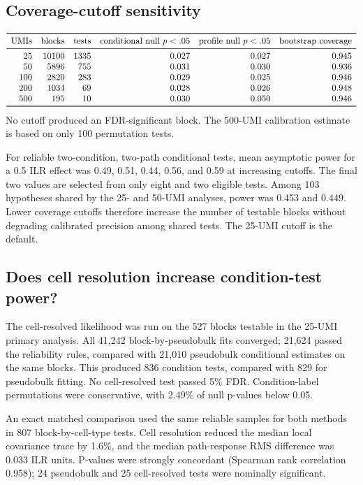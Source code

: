 \documentclass[11pt]{article}
\begin{document}
\subsection*{Coverage-cutoff sensitivity} \[
\begin{array}{rrrrrr}
\toprule
\text{UMIs} & \text{blocks} & \text{tests} &
\text{conditional null }p<.05 & \text{profile null }p<.05 &
\text{bootstrap coverage}\\
\midrule
25  & 10100 & 1335 & 0.027 & 0.027 & 0.945\\
50  &  5896 &  755 & 0.031 & 0.030 & 0.936\\
100 &  2820 &  283 & 0.029 & 0.025 & 0.946\\
200 &  1034 &   69 & 0.028 & 0.026 & 0.948\\
500 &   195 &   10 & 0.030 & 0.050 & 0.946\\
\bottomrule
\end{array}
\]
No cutoff produced an FDR-significant block. The 500-UMI calibration estimate is based on only 100 permutation tests.

For reliable two-condition, two-path conditional tests, mean asymptotic power for a 0.5 ILR effect was 0.49, 0.51, 0.44, 0.56, and 0.59 at increasing cutoffs. The final two values are selected from only eight and two eligible tests. Among 103 hypotheses shared by the 25- and 50-UMI analyses, power was 0.453 and 0.449. Lower coverage cutoffs therefore increase the number of testable blocks without degrading calibrated precision among shared tests. The 25-UMI cutoff is the default.

\subsection*{Does cell resolution increase condition-test power?}

The cell-resolved likelihood was run on the 527 blocks testable in the 25-UMI primary analysis. All 41,242 block-by-pseudobulk fits converged; 21,624 passed the reliability rules, compared with 21,010 pseudobulk conditional estimates on the same blocks. This produced 836 condition tests, compared with 829 for pseudobulk fitting. No cell-resolved test passed 5\% FDR. Condition-label permutations were conservative, with 2.49\% of null p-values below 0.05.

An exact matched comparison used the same reliable samples for both methods in 807 block-by-cell-type tests. Cell resolution reduced the median local covariance trace by 1.6\%, and the median path-response RMS difference was 0.033 ILR units. P-values were strongly concordant (Spearman rank correlation 0.958); 24 pseudobulk and 25 cell-resolved tests were nominally significant.
\end{document}
